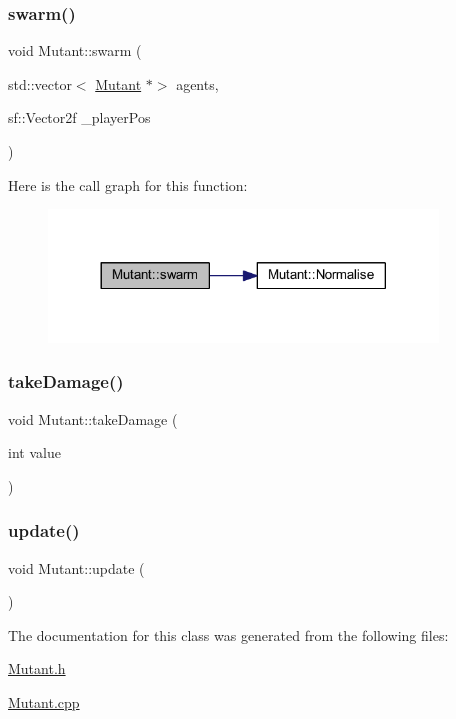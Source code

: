 \mbox{\label{class_mutant_ab5f88d52695dfbece143049c81e9542d}} 
\subsubsection{\texorpdfstring{swarm()}{swarm()}}
{\footnotesize\ttfamily void Mutant\+::swarm (\begin{DoxyParamCaption}\item[{std\+::vector$<$ \hyperlink{class_mutant}{Mutant} $\ast$$>$}]{agents,  }\item[{sf\+::\+Vector2f}]{\+\_\+player\+Pos }\end{DoxyParamCaption})}

Here is the call graph for this function\+:
\nopagebreak
\begin{figure}[H]
\begin{center}
\leavevmode
\includegraphics[width=293pt]{class_mutant_ab5f88d52695dfbece143049c81e9542d_cgraph}
\end{center}
\end{figure}
\mbox{\label{class_mutant_ab03caeb2812412cee78692a29380a47b}} 
\subsubsection{\texorpdfstring{take\+Damage()}{takeDamage()}}
{\footnotesize\ttfamily void Mutant\+::take\+Damage (\begin{DoxyParamCaption}\item[{int}]{value }\end{DoxyParamCaption})}

\mbox{\label{class_mutant_af76cac0ad55dd2d515736f76cf693f40}} 
\subsubsection{\texorpdfstring{update()}{update()}}
{\footnotesize\ttfamily void Mutant\+::update (\begin{DoxyParamCaption}{ }\end{DoxyParamCaption})}



The documentation for this class was generated from the following files\+:\begin{DoxyCompactItemize}
\item 
\hyperlink{_mutant_8h}{Mutant.\+h}\item 
\hyperlink{_mutant_8cpp}{Mutant.\+cpp}\end{DoxyCompactItemize}

